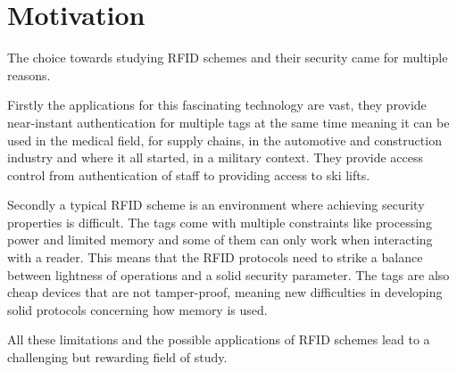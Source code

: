 \chapter*{Motivation} 

The choice towards studying RFID schemes and their security came for multiple reasons. 

Firstly the applications for this fascinating technology are vast, they provide near-instant authentication for multiple tags 
at the same time meaning it can be used in the medical field, for supply chains, in the automotive and construction industry and where 
it all started, in a military context. They provide access control from authentication of staff to providing access to ski lifts.

Secondly a typical RFID scheme is an environment where achieving security properties is difficult. The tags come with multiple 
constraints like processing power and limited memory and some of them can only work when interacting with a reader. This means 
that the RFID protocols need to strike a balance between lightness of operations and a solid security parameter. 
The tags are also cheap devices that are not tamper-proof, meaning new difficulties in developing solid protocols concerning how
memory is used.

All these limitations and the possible applications of RFID schemes lead to a challenging but rewarding 
field of study.